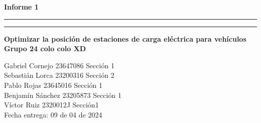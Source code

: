 \documentclass[letterpaper]{article}
\begin{document}
	\begin{center}{}
		\vspace*{2mm}
		{\Huge\bf Informe 1}\\
		\vspace*{4mm}
		\hrule\vspace*{1pt}\hrule
		\vspace*{4mm}
		{\LARGE\bf Optimizar la posición de estaciones de carga eléctrica para vehículos}\\
		\vspace*{4mm}
		{\huge\bf Grupo 24 colo colo XD  }\\
		\vspace*{1mm}
	\end{center}
	
	\vspace*{30mm}
	\flushright 
	
	Gabriel Cornejo 23647086 Sección 1\\
	Sebastián Lorca 23200316 Sección 2\\
	Pablo Rojas	23645016 Sección 1\\
	Benjamín Sánchez  23205873 Sección 1\\
	Víctor Ruiz 2320012J Sección1\\
	
	
	\vspace*{5mm}
	{\large Fecha entrega: 09 de 04 de 2024\\}
	
	\newpage
	\begin{flushleft}
		\tableofcontents
	\end{flushleft}
	
\end{document}
